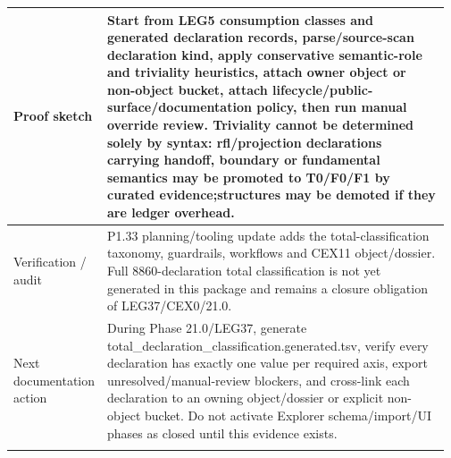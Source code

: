 \begin{longtable}{L{0.16\linewidth} L{0.81\linewidth}}
\hline\addlinespace[0.20em]
Proof sketch & Start from LEG5 consumption classes and generated declaration records, parse/\allowbreak{}source-scan declaration kind, apply conservative semantic-role and triviality heuristics, attach owner object or non-object bucket, attach lifecycle/\allowbreak{}public-surface/\allowbreak{}documentation policy, then run manual override review. Triviality cannot be determined solely by syntax: rfl/\allowbreak{}projection declarations carrying handoff, boundary or fundamental semantics may be promoted to T0/\allowbreak{}F0/\allowbreak{}F1 by curated evidence;\newline structures may be demoted if they are ledger overhead.\\
\hline\addlinespace[0.20em]
Verification /\allowbreak{} audit & P1.33 planning/\allowbreak{}tooling update adds the total-classification taxonomy, guardrails, workflows and CEX11 object/\allowbreak{}dossier. Full 8860-declaration total classification is not yet generated in this package and remains a closure obligation of LEG37/\allowbreak{}CEX0/\allowbreak{}21.0.\\
\hline\addlinespace[0.20em]
Next documentation action & During Phase 21.0/\allowbreak{}LEG37, generate total\_declaration\_classification.generated.tsv, verify every declaration has exactly one value per required axis, export unresolved/\allowbreak{}manual-review blockers, and cross-link each declaration to an owning object/\allowbreak{}dossier or explicit non-object bucket. Do not activate Explorer schema/\allowbreak{}import/\allowbreak{}UI phases as closed until this evidence exists.\\
\hline\addlinespace[0.20em]
\end{longtable}

